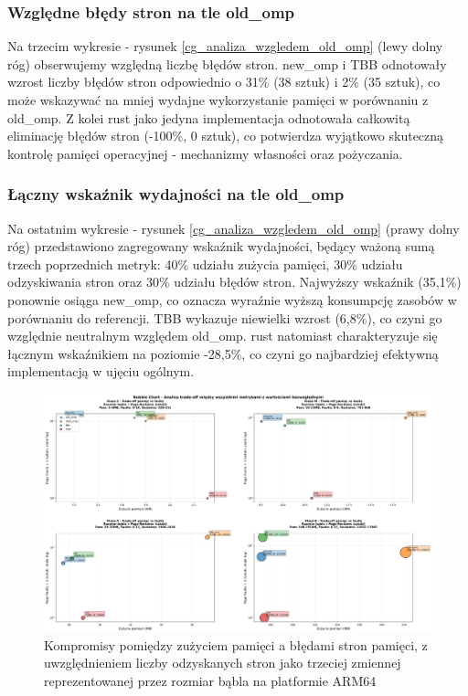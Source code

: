 \subsubsection{Względne błędy stron na tle old\_omp}
Na trzecim wykresie - rysunek \ref{cg_analiza_wzgledem_old_omp} (lewy dolny róg) obserwujemy względną liczbę błędów stron. new\_omp i TBB odnotowały wzrost liczby błędów stron odpowiednio o 31\% (38 sztuk) i 2\% (35 sztuk), co może wskazywać na mniej wydajne wykorzystanie pamięci w porównaniu z old\_omp. Z kolei rust jako jedyna implementacja odnotowała całkowitą eliminację błędów stron (-100\%, 0 sztuk), co potwierdza wyjątkowo skuteczną kontrolę pamięci operacyjnej - mechanizmy własności oraz pożyczania.

\subsubsection{Łączny wskaźnik wydajności na tle old\_omp}
Na ostatnim wykresie - rysunek \ref{cg_analiza_wzgledem_old_omp} (prawy dolny róg) przedstawiono zagregowany wskaźnik wydajności, będący ważoną sumą trzech poprzednich metryk: 40\% udziału zużycia pamięci, 30\% udziału odzyskiwania stron oraz 30\% udziału błędów stron. Najwyższy wskaźnik (35,1\%) ponownie osiąga new\_omp, co oznacza wyraźnie wyższą konsumpcję zasobów w porównaniu do referencji. TBB wykazuje niewielki wzrost (6,8\%), co czyni go względnie neutralnym względem old\_omp. rust natomiast charakteryzuje się łącznym wskaźnikiem na poziomie -28,5\%, co czyni go najbardziej efektywną implementacją w ujęciu ogólnym.

\begin{figure}[H]
    \centering
    \includegraphics[width=\textwidth]{analiza/images/parallel/cg/arm/chart_06_bubble_chart.png}
    \caption{Kompromisy  pomiędzy zużyciem pamięci a błędami stron pamięci, z uwzględnieniem liczby odzyskanych stron jako trzeciej zmiennej reprezentowanej przez rozmiar bąbla na platformie ARM64}
    \label{cg_kompromisy_pamiec_bledy}
\end{figure}

